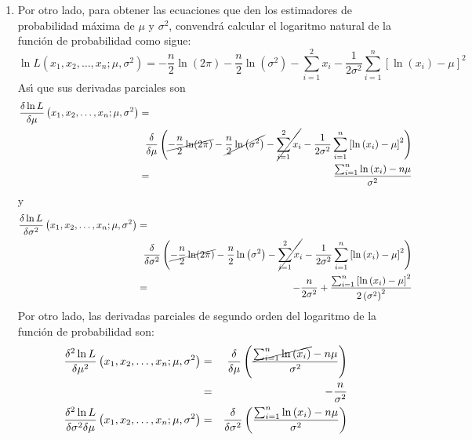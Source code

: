 \begin{solucion}
\begin{enumerate}
  \item Por otro lado, para obtener las ecuaciones que den los estimadores de probabilidad m\'axima de $\mu$ y $\sigma^2$, convendr\'a calcular el logaritmo natural de la funci\'on de probabilidad como sigue:
  \begin{equation*}
   \ln L \left( x_1, x_2, \ldots, x_n; \mu, \sigma^2 \right) = -\frac{n}{2}\ln(2\pi) - \frac{n}{2}\ln\left( \sigma^2 \right) - \sum_{i=1}^2 x_i - \frac{1}{2\sigma^2} \sum_{i=1}^n \left[ \ln\left( x_i \right) - \mu \right]^2
  \end{equation*}
  As\'{\i} que sus derivadas parciales son
  \begin{eqnarray*}
   \frac{\delta \ln L}{\delta \mu} \left( x_1, x_2, \ldots, x_n; \mu, \sigma^2 \right) & = & \\
   & & \hspace{-0.5cm} \frac{\delta}{\delta \mu} \left( \cancel{ -\frac{n}{2}\ln(2\pi) } - \cancel{ \frac{n}{2}\ln\left( \sigma^2 \right) } - \cancel{ \sum_{i=1}^2 x_i } - \frac{1}{2\sigma^2} \sum_{i=1}^n \left[ \ln\left( x_i \right) - \mu \right]^2 \right) \\
   & = & \frac{\sum_{i=1}^n \ln\left( x_i \right) - n\mu}{\sigma^2}
  \end{eqnarray*}
  y
  \begin{eqnarray*}
   \frac{\delta \ln L}{\delta \sigma^2} \left( x_1, x_2, \ldots, x_n; \mu, \sigma^2 \right) & = & \\
   & & \hspace{-0.5cm} \frac{\delta}{\delta \sigma^2} \left( \cancel{ -\frac{n}{2}\ln(2\pi) } - \frac{n}{2}\ln\left( \sigma^2 \right) - \cancel{ \sum_{i=1}^2 x_i } - \frac{1}{2\sigma^2} \sum_{i=1}^n \left[ \ln\left( x_i \right) - \mu \right]^2 \right) \\
   & = & - \frac{n}{2\sigma^2} + \frac{\sum_{i=1}^n \left[ \ln\left( x_i \right) - \mu \right]^2}{2\left( \sigma^2 \right)^2}
  \end{eqnarray*}
  Por otro lado, las derivadas parciales de segundo orden del logaritmo de la funci\'on de probabilidad son:
  \begin{eqnarray*}
   \frac{\delta^2 \ln L}{\delta \mu^2} \left( x_1, x_2, \ldots, x_n; \mu, \sigma^2 \right) & = & \frac{\delta}{\delta \mu} \left( \frac{\cancel{ \sum_{i=1}^n \ln\left( x_i \right) } - n\mu}{\sigma^2} \right) \\
   & = & - \frac{n}{\sigma^2} \\
   \frac{\delta^2 \ln L}{\delta \sigma^2 \delta \mu} \left( x_1, x_2, \ldots, x_n; \mu, \sigma^2 \right) & = & \frac{\delta}{\delta \sigma^2} \left( \frac{\sum_{i=1}^n \ln\left( x_i \right) - n\mu}{\sigma^2} \right) \\

\end{eqnarray*}
\end{enumerate}
\end{solucion}

